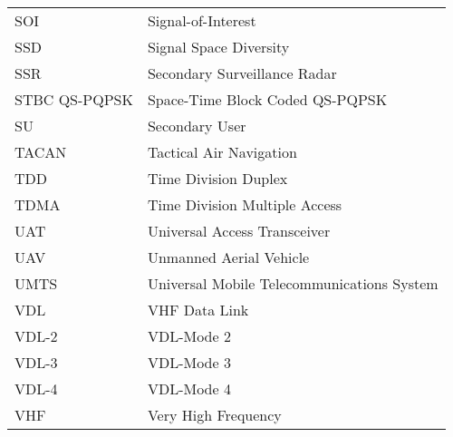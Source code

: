 \begin{longtable}{ll}
SOI	& Signal-of-Interest\\
SSD	& Signal Space Diversity\\
SSR	& Secondary Surveillance Radar \\
STBC QS-PQPSK	& Space-Time Block Coded QS-PQPSK\\
SU	& Secondary User\\
TACAN	& Tactical Air Navigation \\
TDD	& Time Division Duplex\\
TDMA	& Time Division Multiple Access\\
UAT	& Universal Access Transceiver \\
UAV	& Unmanned Aerial Vehicle\\
UMTS & Universal Mobile Telecommunications System\\
VDL	& VHF Data Link\\
VDL-2	& VDL-Mode 2\\
VDL-3	& VDL-Mode 3\\
VDL-4	& VDL-Mode 4\\
VHF	& Very High Frequency\\
\end{longtable}


